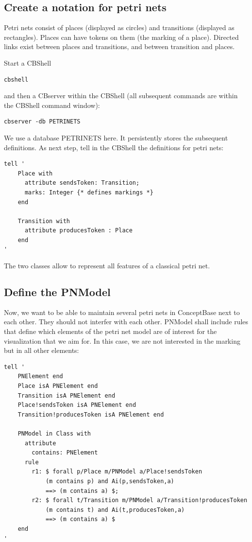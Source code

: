 \documentclass[10pt,a4paper]{article}
\begin{document}
\subsection{Create a notation for petri nets}


Petri nets consist of places (displayed as circles) and transitions (displayed as rectangles).
Places can have tokens on them (the marking of a place). Directed links exist between
places and transitions, and between transition and places.

Start a CBShell 

\begin{verbatim}
cbshell
\end{verbatim}

and then a CBserver within the CBShell (all subsequent commands are within the CBShell command window):

\begin{verbatim}
cbserver -db PETRINETS
\end{verbatim}

We use a database PETRINETS here. It persistently stores the subsequent definitions.
As next step, tell in the CBShell the definitions for petri nets:

\begin{verbatim}
tell '
    Place with
      attribute sendsToken: Transition;
      marks: Integer {* defines markings *}
    end

    Transition with 
      attribute producesToken : Place 
    end
'
\end{verbatim}


The two classes allow to represent all features of a classical petri net.


\subsection{Define the PNModel}


Now, we want to be able to maintain several petri nets in ConceptBase next to each other.
They should not interfer with each other. PNModel shall include rules
that define which elements of the petri net model are of interest for the 
visualization that we aim for. In this case, we are not interested in the marking but in all
other elements:


\begin{verbatim}
tell '
    PNElement end
    Place isA PNElement end
    Transition isA PNElement end
    Place!sendsToken isA PNElement end
    Transition!producesToken isA PNElement end

    PNModel in Class with
      attribute
        contains: PNElement
      rule
        r1: $ forall p/Place m/PNModel a/Place!sendsToken
            (m contains p) and Ai(p,sendsToken,a)
            ==> (m contains a) $;
        r2: $ forall t/Transition m/PNModel a/Transition!producesToken
            (m contains t) and Ai(t,producesToken,a) 
            ==> (m contains a) $
    end
'
\end{verbatim}
\end{document}
